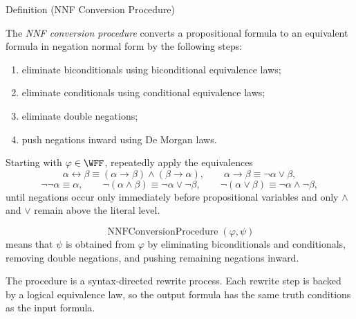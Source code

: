 \begin{definitionbox}{Definition (NNF Conversion Procedure)}
\begin{definition}
\label{def:nnf-conversion-procedure-propositional-logic}
The \emph{NNF conversion procedure} converts a propositional formula to an
equivalent formula in negation normal form by the following steps:
\begin{enumerate}
\item eliminate biconditionals using biconditional equivalence laws;
\item eliminate conditionals using conditional equivalence laws;
\item eliminate double negations;
\item push negations inward using De Morgan laws.
\end{enumerate}
\end{definition}
\end{definitionbox}

\begin{remark*}
Starting with \(\varphi\in\WFF\), repeatedly apply the equivalences
\[
\alpha\leftrightarrow\beta
\equiv
(\alpha\to\beta)\land(\beta\to\alpha),
\qquad
\alpha\to\beta\equiv\neg\alpha\lor\beta,
\]
\[
\neg\neg\alpha\equiv\alpha,
\qquad
\neg(\alpha\land\beta)\equiv\neg\alpha\lor\neg\beta,
\qquad
\neg(\alpha\lor\beta)\equiv\neg\alpha\land\neg\beta,
\]
until negations occur only immediately before propositional variables and only
\(\land\) and \(\lor\) remain above the literal level.
\end{remark*}

\begin{remark*}
\[
\operatorname{NNFConversionProcedure}(\varphi,\psi)
\]
means that \(\psi\) is obtained from \(\varphi\) by eliminating
biconditionals and conditionals, removing double negations, and pushing
remaining negations inward.
\end{remark*}

\begin{remark*}[Interpretation]
The procedure is a syntax-directed rewrite process. Each rewrite step is backed
by a logical equivalence law, so the output formula has the same truth
conditions as the input formula.
\end{remark*}

